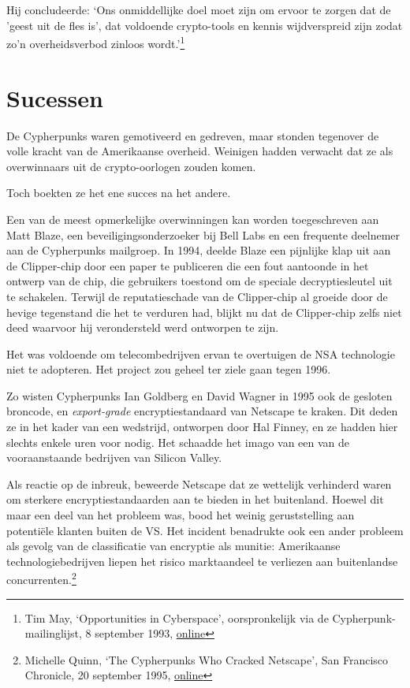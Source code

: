 \documentclass[
  a5paper,
  smalldemyvopaper,11pt,twoside,onecolumn,openright,extrafontsizes]{memoir}
\begin{document}
Hij concludeerde: `Ons onmiddellijke doel moet zijn om ervoor te zorgen
dat de 'geest uit de fles is', dat voldoende crypto-tools en kennis
wijdverspreid zijn zodat zo'n overheidsverbod zinloos wordt.'\footnote{Tim
  May, `Opportunities in Cyberspace', oorspronkelijk via de
  Cypherpunk-mailinglijst, 8 september 1993,
  \href{https://cypherpunks.venona.com/date/1993/09/msg00140.html}{online}}

\section{Sucessen}\label{sucessen}

De Cypherpunks waren gemotiveerd en gedreven, maar stonden tegenover de
volle kracht van de Amerikaanse overheid. Weinigen hadden verwacht dat
ze als overwinnaars uit de crypto-oorlogen zouden komen.

Toch boekten ze het ene succes na het andere.

Een van de meest opmerkelijke overwinningen kan worden toegeschreven aan
Matt Blaze, een beveiligingsonderzoeker bij Bell Labs en een frequente
deelnemer aan de Cypherpunks mailgroep. In 1994, deelde Blaze een
pijnlijke klap uit aan de Clipper-chip door een paper te publiceren die
een fout aantoonde in het ontwerp van de chip, die gebruikers toestond
om de speciale decryptiesleutel uit te schakelen. Terwijl de
reputatieschade van de Clipper-chip al groeide door de hevige tegenstand
die het te verduren had, blijkt nu dat de Clipper-chip zelfs niet deed
waarvoor hij verondersteld werd ontworpen te zijn.

Het was voldoende om telecombedrijven ervan te overtuigen de NSA
technologie niet te adopteren. Het project zou geheel ter ziele gaan
tegen 1996.

Zo wisten Cypherpunks Ian Goldberg en David Wagner in 1995 ook de
gesloten broncode, en \emph{export-grade} encryptiestandaard van
Netscape te kraken. Dit deden ze in het kader van een wedstrijd,
ontworpen door Hal Finney, en ze hadden hier slechts enkele uren voor
nodig. Het schaadde het imago van een van de vooraanstaande bedrijven
van Silicon Valley.

Als reactie op de inbreuk, beweerde Netscape dat ze wettelijk verhinderd
waren om sterkere encryptiestandaarden aan te bieden in het buitenland.
Hoewel dit maar een deel van het probleem was, bood het weinig
geruststelling aan potentiële klanten buiten de VS. Het incident
benadrukte ook een ander probleem als gevolg van de classificatie van
encryptie als munitie: Amerikaanse technologiebedrijven liepen het
risico marktaandeel te verliezen aan buitenlandse
concurrenten.\footnote{Michelle Quinn, `The Cypherpunks Who Cracked
  Netscape', San Francisco Chronicle, 20 september 1995,
  \href{https://people.eecs.berkeley.edu//~daw/press/iang/ian1.html}{online}}
\end{document}
